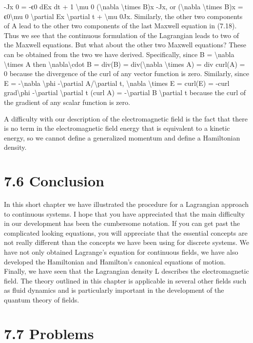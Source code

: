 -Jx
0 = -ϵ0
dEx
dt
+ 1
\textbackslash{}mu 0
(\textbackslash{}nabla \textbackslash{}times  B)x -Jx,
or
(\textbackslash{}nabla \textbackslash{}times  B)x = ϵ0\textbackslash{}mu 0
\textbackslash{}partial Ex
\textbackslash{}partial t
+ \textbackslash{}mu 0Jx.
Similarly, the other two components of A lead to the other two components of
the last Maxwell equation in (7.18).
Thus we see that the continuous formulation of the Lagrangian leads to
two of the Maxwell equations. But what about the other two Maxwell equations? These can be obtained from the two we have derived. Specifically, since
B = \textbackslash{}nabla \textbackslash{}times  A then
\textbackslash{}nabla\textbackslash{}cdot  B = div(B) = div(\textbackslash{}nabla \textbackslash{}times  A) = div curl(A) = 0
because the divergence of the curl of any vector function is zero. Similarly,
since E = -\textbackslash{}nabla \textbackslash{}phi  -\textbackslash{}partial A/\textbackslash{}partial t,
\textbackslash{}nabla \textbackslash{}times  E = curl(E) = -curl grad\textbackslash{}phi -\textbackslash{}partial
\textbackslash{}partial t (curl A) = -\textbackslash{}partial B
\textbackslash{}partial t
because the curl of the gradient of any scalar function is zero.

A difficulty with our description of the electromagnetic field is the fact
that there is no term in the electromagnetic field energy that is equivalent to
a kinetic energy, so we cannot define a generalized momentum and define a
Hamiltonian density.
\section*{7.6  Conclusion}

In this short chapter we have illustrated the procedure for a Lagrangian
approach to continuous systems. I hope that you have appreciated that the main
difficulty in our development has been the cumbersome notation. If you can get
past the complicated looking equations, you will appreciate that the essential
concepts are not really different than the concepts we have been using for discrete systems.
We have not only obtained Lagrange's equation for continuous fields, we
have also developed the Hamiltonian and Hamilton's canonical equations of
motion. Finally, we have seen that the Lagrangian density L describes the electromagnetic field.
The theory outlined in this chapter is applicable in several other fields such
as fluid dynamics and is particularly important in the development of the quantum theory of fields.
\section*{7.7  Problems}


